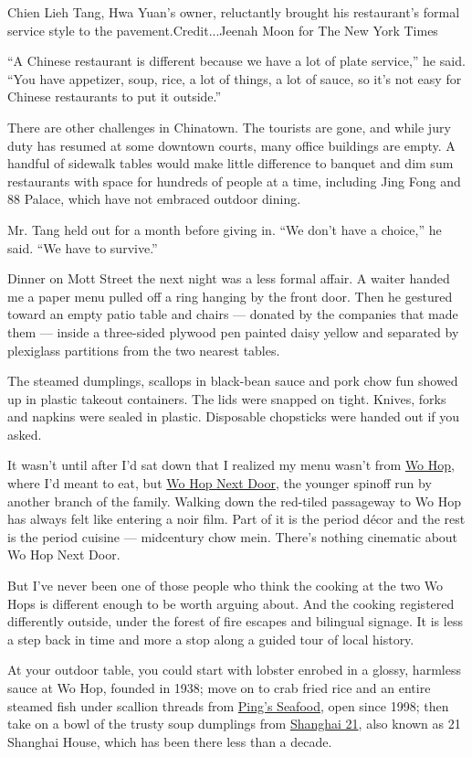 Chien Lieh Tang, Hwa Yuan's owner, reluctantly brought his restaurant's
formal service style to the pavement.Credit...Jeenah Moon for The New
York Times

``A Chinese restaurant is different because we have a lot of plate
service,'' he said. ``You have appetizer, soup, rice, a lot of things, a
lot of sauce, so it's not easy for Chinese restaurants to put it
outside.''

There are other challenges in Chinatown. The tourists are gone, and
while jury duty has resumed at some downtown courts, many office
buildings are empty. A handful of sidewalk tables would make little
difference to banquet and dim sum restaurants with space for hundreds of
people at a time, including Jing Fong and 88 Palace, which have not
embraced outdoor dining.

Mr. Tang held out for a month before giving in. ``We don't have a
choice,'' he said. ``We have to survive.''

Dinner on Mott Street the next night was a less formal affair. A waiter
handed me a paper menu pulled off a ring hanging by the front door. Then
he gestured toward an empty patio table and chairs --- donated by the
companies that made them --- inside a three-sided plywood pen painted
daisy yellow and separated by plexiglass partitions from the two nearest
tables.

The steamed dumplings, scallops in black-bean sauce and pork chow fun
showed up in plastic takeout containers. The lids were snapped on tight.
Knives, forks and napkins were sealed in plastic. Disposable chopsticks
were handed out if you asked.

It wasn't until after I'd sat down that I realized my menu wasn't from
\href{https://www.wohop17.com/}{Wo Hop}, where I'd meant to eat, but
\href{https://www.wohop15.com/menu}{Wo Hop Next Door}, the younger
spinoff run by another branch of the family. Walking down the red-tiled
passageway to Wo Hop has always felt like entering a noir film. Part of
it is the period décor and the rest is the period cuisine --- midcentury
chow mein. There's nothing cinematic about Wo Hop Next Door.

But I've never been one of those people who think the cooking at the two
Wo Hops is different enough to be worth arguing about. And the cooking
registered differently outside, under the forest of fire escapes and
bilingual signage. It is less a step back in time and more a stop along
a guided tour of local history.

At your outdoor table, you could start with lobster enrobed in a glossy,
harmless sauce at Wo Hop, founded in 1938; move on to crab fried rice
and an entire steamed fish under scallion threads from
\href{https://www.nytimes.com/2000/08/09/dining/restaurants-diners-and-dinner-exchanging-glances.html?searchResultPosition=1}{Ping's
Seafood}, open since 1998; then take on a bowl of the trusty soup
dumplings from \href{https://shanghai21togo.com/\#}{Shanghai 21}, also
known as 21 Shanghai House, which has been there less than a decade.


